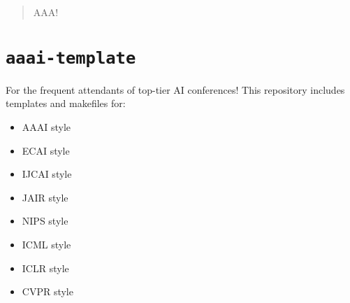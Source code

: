 % 
% 
% 
% 
% 
% 
\begin{abstract}
AAA!
\end{abstract}





\section{\texttt{aaai-template}}\label{aaai-template}

For the frequent attendants of top-tier AI conferences!
This repository includes templates and makefiles for:

\begin{itemize}

\item
  AAAI style
\item
  ECAI style
\item
  IJCAI style
\item
  JAIR style
\item
  NIPS style
\item
  ICML style
\item
  ICLR style
\item
  CVPR style
\end{itemize}

